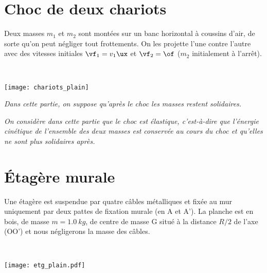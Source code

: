 \documentclass[a4paper, 10pt, final, garamond]{book}
\begin{document}
\section{Choc de deux chariots}
\noindent
\begin{minipage}[c]{.45\linewidth}
	Deux masses $m_1$ et $m_2$ sont montées sur un banc horizontal à coussins
	d'air, de sorte qu'on peut négliger tout frottements. On les projette l'une
	contre l'autre avec des vitesses initiales $\vf_1 = v_1 \ux$ et $\vf_2 =
		\of$ ($m_2$ initialement à l'arrêt).
\end{minipage}
\hfill
\begin{minipage}[c]{.45\linewidth}
	~
	\begin{center}
		\texttt{[image: chariots\_plain]}
	\end{center}
\end{minipage}
\begin{blocQR}
	\item \textit{Dans cette partie, on suppose qu'après le choc les masses
		restent solidaires.}
\end{blocQR}
\begin{blocQR}
	\item \textit{On considère dans cette partie que le choc est élastique,
		c'est-à-dire que l'énergie cinétique de l'ensemble des deux masses est
		conservée au cours du choc et qu'elles ne sont plus solidaires après.}
\end{blocQR}

\section{Étagère murale}
\noindent
\begin{minipage}[c]{.45\linewidth}
	Une étagère est suspendue par quatre câbles métalliques et fixée au mur
	uniquement par deux pattes de fixation murale (en A et A'). La planche est en
	bois, de masse $m = \SI{1.0}{kg}$, de centre de masse G situé à la distance
	$R/2$ de l'axe (OO') et nous négligerons la masse des câbles.
\end{minipage}
\hfill
\begin{minipage}[c]{.45\linewidth}
	~
	\begin{center}
		\texttt{[image: etg\_plain.pdf]}
	\end{center}
\end{minipage}
\end{document}
